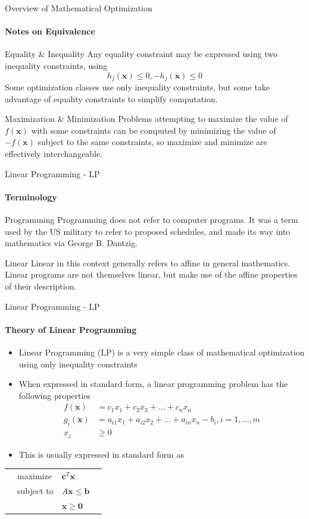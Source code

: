 \documentclass{beamer}
\renewcommand{\vec}{\mathbf}
\begin{document}
	\begin{frame}{Overview of Mathematical Optimization}
		\framesubtitle{Notes on Equivalence}
		\begin{block}{Equality \& Inequality}
			Any equality constraint may be expressed using two inequality constraints, using\[h_j(\vec{x})\leq 0, -h_j(\vec{x})\leq 0\]
			Some optimization classes use only inequality constraints, but some take advantage of equality constraints to simplify computation.
		\end{block}
		\begin{block}{Maximization \& Minimization}
			Problems attempting to maximize the value of $f(\vec{x})$ with some constraints can be computed by minimizing the value of $-f(\vec{x})$ subject to the same constraints, so maximize and minimize are effectively interchangeable.
		\end{block}
	\end{frame}

	\begin{frame}{Linear Programming - LP}
		\framesubtitle{Terminology}
		\begin{block}{Programming}
			Programming does not refer to computer programs. It was a term used by the US military to refer to proposed schedules, and made its way into mathematics via George B. Dantzig.
		\end{block}
		\begin{block}{Linear}
			Linear in this context generally refers to affine in general mathematics. Linear programs are not themselves linear, but make use of the affine properties of their description.
		\end{block}
	\end{frame}

	\begin{frame}{Linear Programming - LP}
		\framesubtitle{Theory of Linear Programming}
		\begin{itemize}
			\item Linear Programming (LP) is a very simple class of mathematical optimization using only inequality constraints
			\item When expressed in standard form, a linear programming problem has the following properties
			\begin{align*}
				f(\vec{x}) &= c_1x_1 + c_2x_2 + ... + c_nx_n\\
				g_i(\vec{x}) &= a_{i1}x_1 + a_{i2}x_2 + ... + a_{in}x_n - b_i, i=1,...,m\\
				x_j &\geq 0
			\end{align*}
			\item This is usually expressed in standard form as 
		\end{itemize}
		\begin{tabularx}{\textwidth}{X l l X}
			& maximize		& $\vec{c}^T\vec{x}$		& \\
			& subject to	& $A\vec{x} \leq \vec{b}$	& \\
			& 				& $\vec{x} \geq \vec{0}$	& 
		\end{tabularx}
	\end{frame}
\end{document}
